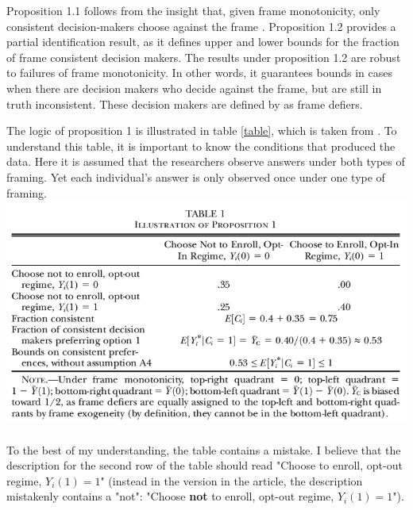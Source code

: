 Proposition 1.1 follows from the insight that, given frame monotonicity, only consistent decision-makers choose against the frame \parencite[p. 2768]{goldin2020}.
Proposition 1.2 provides a partial identification result, as it defines upper and lower bounds for the fraction of frame consistent decision makers. The results under 
proposition 1.2 are robust to failures of frame monotonicity. In other words, it guarantees bounds in cases when there are decision makers
who decide against the frame, but are still in truth inconsistent. These decision makers are defined by \textcite[p. 2768]{goldin2020}
as frame defiers.

The logic of proposition 1 is illustrated in table \ref{table}, which is taken from \textcite[p. 2769]{goldin2020}. To understand this table, it is important to 
know the conditions that produced the data. Here it is assumed that the researchers observe answers under both types of framing. Yet each individual's answer is only
observed once under one type of framing.
\includegraphics{table.png} \label{table}
\\
\\
To the best of my understanding, the table contains a mistake. I believe that the description for the second row of the table should read
"Choose to enroll, opt-out regime, $ Y_i(1) = 1$" (instead in the version in the article, the description mistakenly contains a "not": "Choose \textbf{not} to enroll, opt-out regime, $ Y_i(1) = 1$").

